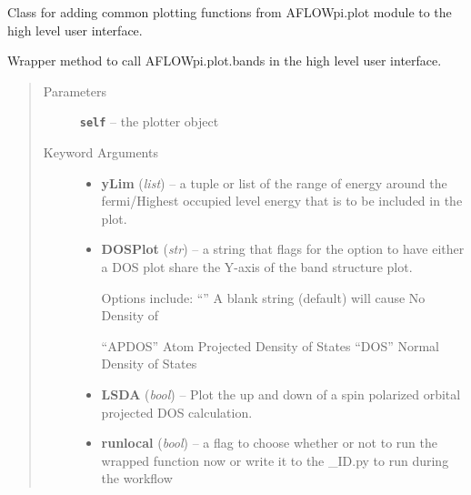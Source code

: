 \documentclass[letterpaper,10pt,english]{sphinxmanual}
\begin{document}
\begin{fulllineitems}
\label{prep:prep.plotter}
Class for adding common plotting functions from AFLOWpi.plot module to the high level user
interface.

\begin{fulllineitems}
\label{prep:prep.plotter.bands}
Wrapper method to call AFLOWpi.plot.bands in the high level user interface.
\begin{quote}\begin{description}
\item[{Parameters}] \leavevmode
\textbf{\texttt{self}} -- the plotter object

\item[{Keyword Arguments}] \leavevmode\begin{itemize}
\item {} 
\textbf{yLim} (\emph{list}) --
a tuple or list of the range of energy around the fermi/Highest
occupied level energy that is to be included in the plot.

\item {} 
\textbf{DOSPlot} (\emph{str}) --
a string that flags for the option to have either a DOS plot
share the Y-axis of the band structure plot.

Options include:
``''      \textbar{} A blank string (default) will cause No Density of
\begin{quote}

\end{quote}

``APDOS'' \textbar{} Atom Projected Density of States
``DOS''   \textbar{} Normal Density of States

\item {} 
\textbf{LSDA} (\emph{bool}) --
Plot the up and down of a spin polarized orbital projected DOS
calculation.

\item {} 
\textbf{runlocal} (\emph{bool}) --
a flag to choose whether or not to run the wrapped function now
or write it to the \_ID.py to run during the workflow


\end{itemize}
\end{description}
\end{quote}
\end{fulllineitems}
\end{fulllineitems}
\end{document}
